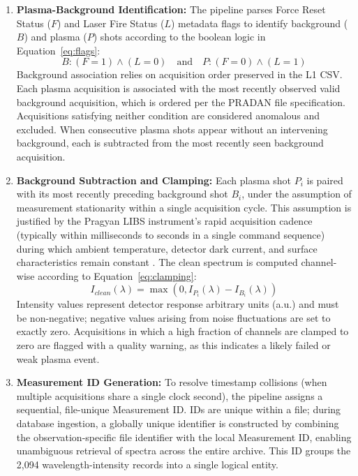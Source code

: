 \documentclass[final,5p,twocolumn,a4paper]{elsarticle}
\begin{document}
\begin{enumerate}
    \item \textbf{Plasma-Background Identification:} The pipeline parses Force Reset Status ($F$) and Laser Fire Status ($L$) metadata flags to identify background ($B$) and plasma ($P$) shots according to the boolean logic in Equation~\eqref{eq:flags}:
    \begin{equation}
        \label{eq:flags}
        B: (F = 1) \land (L = 0) \quad \text{and} \quad P: (F = 0) \land (L = 1)
    \end{equation}
    Background association relies on acquisition order preserved in the L1 CSV. Each plasma acquisition is associated with the most recently observed valid background acquisition, which is ordered per the PRADAN file specification. Acquisitions satisfying neither condition are considered anomalous and excluded. When consecutive plasma shots appear without an intervening background, each is subtracted from the most recently seen background acquisition.
    \item \textbf{Background Subtraction and Clamping:} Each plasma shot $P_i$ is paired with its most recently preceding background shot $B_i$, under the assumption of measurement stationarity within a single acquisition cycle. This assumption is justified by the Pragyan LIBS instrument's rapid acquisition cadence (typically within milliseconds to seconds in a single command sequence) during which ambient temperature, detector dark current, and surface characteristics remain constant \cite{sridhar2024libs, isro_chandrayaan3_libs}. The clean spectrum is computed channel-wise according to Equation~\eqref{eq:clamping}:
    \begin{equation}
        \label{eq:clamping}
        I_{clean}(\lambda) = \max(0, I_{P_i}(\lambda) - I_{B_i}(\lambda))
    \end{equation}
    Intensity values represent detector response arbitrary units (a.u.) and must be non-negative; negative values arising from noise fluctuations are set to exactly zero. Acquisitions in which a high fraction of channels are clamped to zero are flagged with a quality warning, as this indicates a likely failed or weak plasma event.
    \item \textbf{Measurement ID Generation:} To resolve timestamp collisions (when multiple acquisitions share a single clock second), the pipeline assigns a sequential, file-unique Measurement ID. IDs are unique within a file; during database ingestion, a globally unique identifier is constructed by combining the observation-specific file identifier with the local Measurement ID, enabling unambiguous retrieval of spectra across the entire archive. This ID groups the 2,094 wavelength-intensity records into a single logical entity.
\end{enumerate}
\end{document}
